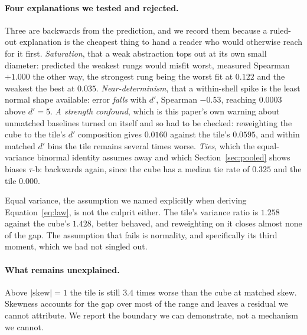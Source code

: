 \begin{table}[t]
\centering

\caption{Where the domain gap lives. Every class is worse on the sliding tile,
but pattern databases are worse by nearly twice the factor learned heuristics
are, which is the split the skew account predicts.}
\label{tab:domainclass}
\end{table}

\paragraph{Four explanations we tested and rejected.} Three are backwards from
the prediction, and we record them because a ruled-out explanation is the
cheapest thing to hand a reader who would otherwise reach for it first.
\emph{Saturation}, that a weak abstraction tops out at its own small diameter:
predicted the weakest rungs would misfit worst, measured Spearman $+1.000$ the
other way, the strongest rung being the worst fit at $0.122$ and the weakest the
best at $0.035$. \emph{Near-determinism}, that a within-shell spike is the least
normal shape available: error \emph{falls} with $d'$, Spearman $-0.53$, reaching
$0.0003$ above $d' = 5$. \emph{A strength confound}, which is this paper's own
warning about unmatched baselines turned on itself and so had to be checked:
reweighting the cube to the tile's $d'$ composition gives $0.0160$ against the
tile's $0.0595$, and within matched $d'$ bins the tile remains several times
worse. \emph{Ties}, which the equal-variance binormal identity assumes away and
which Section~\ref{sec:pooled} shows biases $\tau$-b: backwards again, since the
cube has a median tie rate of $0.325$ and the tile $0.000$.

Equal variance, the assumption we named explicitly when deriving
Equation~\ref{eq:law}, is not the culprit either. The tile's variance ratio is
$1.258$ against the cube's $1.428$, better behaved, and reweighting on it closes
almost none of the gap. The assumption that fails is normality, and specifically
its third moment, which we had not singled out.

\paragraph{What remains unexplained.} Above $|\mathrm{skew}| = 1$ the tile is
still $3.4$ times worse than the cube at matched skew. Skewness accounts for the
gap over most of the range and leaves a residual we cannot attribute. We report
the boundary we can demonstrate, not a mechanism we cannot.
